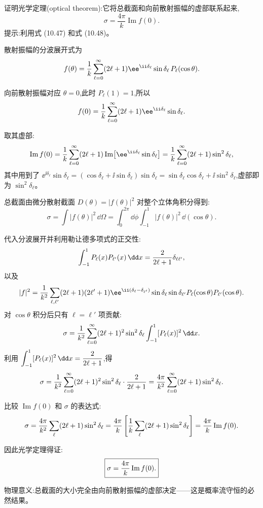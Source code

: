 \begin{question}
证明光学定理(optical theorem):它将总截面和向前散射振幅的虚部联系起来,
\[
\sigma=\frac{4\pi}{k}\operatorname{Im} f(0).
\]
提示:利用式 (10.47) 和式 (10.48)。

\par\smallskip
{}

\end{question}
\begin{solution}
散射振幅的分波展开式为
\[
f(\theta)={1\over k}\sum_{\ell=0}^{\infty}(2\ell+1)\ee^{\ii\delta_\ell}\sin\delta_\ell\,P_\ell(\cos\theta).
\]

向前散射振幅对应 $\theta=0$,此时 $P_\ell(1)=1$,所以
\[
f(0)={1\over k}\sum_{\ell=0}^{\infty}(2\ell+1)\ee^{\ii\delta_\ell}\sin\delta_\ell.
\]

取其虚部:
\[
\operatorname{Im}f(0)={1\over k}\sum_{\ell=0}^{\infty}(2\ell+1)\operatorname{Im}\bigl[\ee^{\ii\delta_\ell}\sin\delta_\ell\bigr]
={1\over k}\sum_{\ell=0}^{\infty}(2\ell+1)\sin^2\delta_\ell,
\]
其中用到了 $\ee^{\ii\delta_\ell}\sin\delta_\ell=(\cos\delta_\ell+\ii\sin\delta_\ell)\sin\delta_\ell=\sin\delta_\ell\cos\delta_\ell+\ii\sin^2\delta_\ell$,虚部即为 $\sin^2\delta_\ell$。

总截面由微分散射截面 $D(\theta)=|f(\theta)|^2$ 对整个立体角积分得到:
\[
\sigma=\int|f(\theta)|^2\,\dd\Omega
=\int_0^{2\pi}\dd\phi\int_{-1}^{1}|f(\theta)|^2\,\dd(\cos\theta).
\]

代入分波展开并利用勒让德多项式的正交性:
\[
\int_{-1}^{1}P_\ell(x)P_{\ell'}(x)\,\dd x={2\over2\ell+1}\delta_{\ell\ell'},
\]
以及
\[
|f|^2={1\over k^2}\sum_{\ell,\ell'}(2\ell+1)(2\ell'+1)\ee^{\ii(\delta_\ell-\delta_{\ell'})}\sin\delta_\ell\sin\delta_{\ell'}P_\ell(\cos\theta)P_{\ell'}(\cos\theta).
\]
对 $\cos\theta$ 积分后只有 $\ell=\ell'$ 项贡献:
\[
\sigma={1\over k^2}\sum_{\ell=0}^{\infty}(2\ell+1)^2\sin^2\delta_\ell\int_{-1}^{1}[P_\ell(x)]^2\,\dd x.
\]
利用 $\displaystyle\int_{-1}^{1}[P_\ell(x)]^2\,\dd x={2\over2\ell+1}$,得
\[
\sigma={1\over k^2}\sum_{\ell=0}^{\infty}(2\ell+1)^2\sin^2\delta_\ell\cdot{2\over2\ell+1}
={4\pi\over k^2}\sum_{\ell=0}^{\infty}(2\ell+1)\sin^2\delta_\ell.
\]

比较 $\operatorname{Im}f(0)$ 和 $\sigma$ 的表达式:
\[
\sigma={4\pi\over k^2}\sum_{\ell}(2\ell+1)\sin^2\delta_\ell
={4\pi\over k}\left[{1\over k}\sum_{\ell}(2\ell+1)\sin^2\delta_\ell\right]
={4\pi\over k}\operatorname{Im}f(0).
\]

因此光学定理得证:
\[
\boxed{\sigma={4\pi\over k}\operatorname{Im}f(0).}
\]

物理意义:总截面的大小完全由向前散射振幅的虚部决定——这是概率流守恒的必然结果。
\end{solution}

